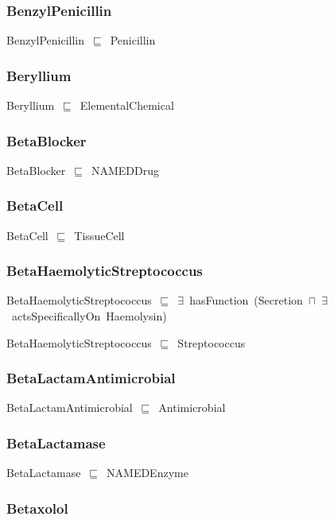 \documentclass{article}
\begin{document}
\subsubsection*{BenzylPenicillin}

BenzylPenicillin~\ensuremath{\sqsubseteq}~Penicillin~

\subsubsection*{Beryllium}

Beryllium~\ensuremath{\sqsubseteq}~ElementalChemical~

\subsubsection*{BetaBlocker}

BetaBlocker~\ensuremath{\sqsubseteq}~NAMEDDrug~

\subsubsection*{BetaCell}

BetaCell~\ensuremath{\sqsubseteq}~TissueCell~

\subsubsection*{BetaHaemolyticStreptococcus}

BetaHaemolyticStreptococcus~\ensuremath{\sqsubseteq}~\ensuremath{\exists}~hasFunction~(Secretion~\ensuremath{\sqcap}~\ensuremath{\exists}~actsSpecificallyOn~Haemolysin)~

BetaHaemolyticStreptococcus~\ensuremath{\sqsubseteq}~Streptococcus~

\subsubsection*{BetaLactamAntimicrobial}

BetaLactamAntimicrobial~\ensuremath{\sqsubseteq}~Antimicrobial~

\subsubsection*{BetaLactamase}

BetaLactamase~\ensuremath{\sqsubseteq}~NAMEDEnzyme~

\subsubsection*{Betaxolol}
\end{document}
